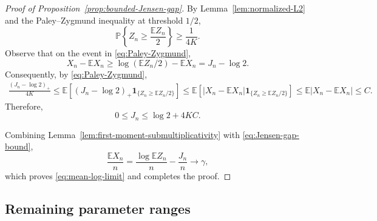 \documentclass[12pt,preprint]{amsart}
\numberwithin{equation}{section}
\theoremstyle{plain}
\theoremstyle{definition}
\newcommand{\E}{\mathbb E}
\newcommand{\Pp}{\mathbb P}
\newcommand{\ind}{\mathbf 1}
\begin{document}
\begin{proof}[Proof of Proposition~\ref{prop:bounded-Jensen-gap}]
By Lemma~\ref{lem:normalized-L2} and the Paley--Zygmund inequality at
threshold $1/2$,
\begin{equation}
 \Pp\left\{Z_n\ge\frac{\E Z_n}{2}\right\}\ge\frac1{4K}.
 \label{eq:Paley-Zygmund}
\end{equation}
Observe that on the event in \eqref{eq:Paley-Zygmund},
\begin{equation}
 X_n-\E X_n\ge\log(\E Z_n/2)-\E X_n=J_n-\log2.
 \label{eq:jensen-event-comparison}
\end{equation}
Consequently, by \eqref{eq:Paley-Zygmund},
\[
\begin{aligned}
 \frac{(J_n-\log2)_+}{4K}
 \le\E\left[(J_n-\log2)_+
   \ind_{\{Z_n\ge\E Z_n/2\}}\right]
 \le\E\left[|X_n-\E X_n|
   \ind_{\{Z_n\ge\E Z_n/2\}}\right]
 \le\E|X_n-\E X_n|\le C.
\end{aligned}
\]
Therefore,
\begin{equation}
 0\le J_n\le\log2+4KC.
 \label{eq:Jensen-gap-bound}
\end{equation}

Combining Lemma~\ref{lem:first-moment-submultiplicativity} with
\eqref{eq:Jensen-gap-bound},
\[
 \frac{\E X_n}{n}
 =\frac{\log\E Z_n}{n}-\frac{J_n}{n}
 \longrightarrow \gamma,
\]
which proves \eqref{eq:mean-log-limit} and completes the proof.
\end{proof}

\subsection{Remaining parameter ranges}
\label{sec:remaining-ranges}
\end{document}
